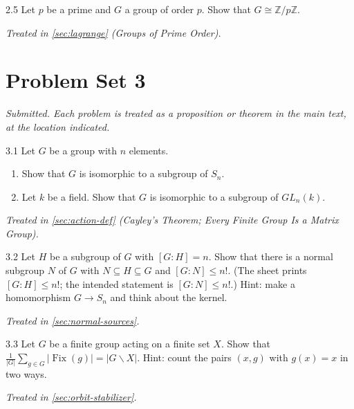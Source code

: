 \documentclass[11pt]{report}
\begin{document}
\begin{hwbox}{2.5}\label{hw:2.5}
Let $p$ be a prime and $G$ a group of order $p$. Show that $G \cong \mathbb{Z}/p\mathbb{Z}$.
\end{hwbox}
\textit{Treated in \ref{sec:lagrange} (Groups of Prime Order).}

\section*{Problem Set 3}
{}

\textit{Submitted. Each problem is treated as a proposition or theorem in the main text, at the location indicated.}

\begin{hwbox}{3.1}\label{hw:3.1}
Let $G$ be a group with $n$ elements.
\begin{enumerate}
    \item Show that $G$ is isomorphic to a subgroup of $S_n$.
    \item Let $k$ be a field. Show that $G$ is isomorphic to a subgroup of $GL_n(k)$.
\end{enumerate}
\end{hwbox}
\textit{Treated in \ref{sec:action-def} (Cayley's Theorem; Every Finite Group Is a Matrix Group).}

\begin{hwbox}{3.2}\label{hw:3.2}
Let $H$ be a subgroup of $G$ with $[G : H] = n$. Show that there is a normal subgroup $N$ of $G$ with $N \subseteq H \subseteq G$ and $[G : N] \leq n!$. (The sheet prints $[G : H] \leq n!$; the intended statement is $[G : N] \leq n!$.) Hint: make a homomorphism $G \to S_n$ and think about the kernel.
\end{hwbox}
\textit{Treated in \ref{sec:normal-sources}.}

\begin{hwbox}{3.3}\label{hw:3.3}
Let $G$ be a finite group acting on a finite set $X$. Show that $\frac{1}{|G|}\sum_{g \in G} |\operatorname{Fix}(g)| = |G \backslash X|$. Hint: count the pairs $(x, g)$ with $g(x) = x$ in two ways.
\end{hwbox}
\textit{Treated in \ref{sec:orbit-stabilizer}.}
\end{document}

